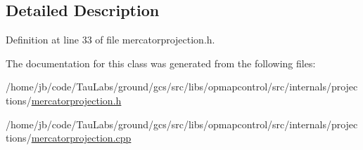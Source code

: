 \subsection{\-Detailed \-Description}


\-Definition at line 33 of file mercatorprojection.\-h.



\-The documentation for this class was generated from the following files\-:\begin{DoxyCompactItemize}
\item 
/home/jb/code/\-Tau\-Labs/ground/gcs/src/libs/opmapcontrol/src/internals/projections/\hyperlink{mercatorprojection_8h}{mercatorprojection.\-h}\item 
/home/jb/code/\-Tau\-Labs/ground/gcs/src/libs/opmapcontrol/src/internals/projections/\hyperlink{mercatorprojection_8cpp}{mercatorprojection.\-cpp}\end{DoxyCompactItemize}
